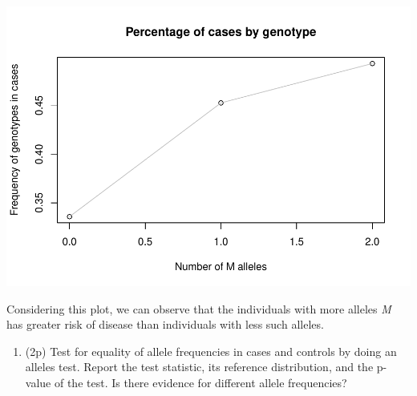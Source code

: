 \documentclass[
]{article}
\providecommand{\tightlist}{%
  \setlength{\itemsep}{0pt}\setlength{\parskip}{0pt}}
\begin{document}
\includegraphics{P062020_Association_analysis_files/figure-latex/second-1.pdf}

Considering this plot, we can observe that the individuals with more
alleles \emph{M} has greater risk of disease than individuals with less
such alleles.

\begin{enumerate}
\def\labelenumi{\arabic{enumi}.}
\setcounter{enumi}{2}
\tightlist
\item
  (2p) Test for equality of allele frequencies in cases and controls by
  doing an alleles test. Report the test statistic, its reference
  distribution, and the p-value of the test. Is there evidence for
  different allele frequencies?
\end{enumerate}
\end{document}

